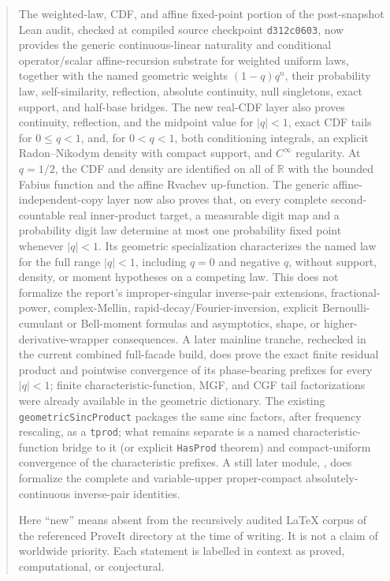 \documentclass[11pt,oneside]{article}
\theoremstyle{definition}
\theoremstyle{remark}
\newcommand{\R}{\mathbb R}
\newcommand{\1}{\mathbf 1}
\begin{document}
\begin{abstract}
The weighted-law, CDF, and affine fixed-point portion of the post-snapshot Lean audit,
checked at compiled source checkpoint
\texttt{d312c0603}, now provides the generic continuous-linear naturality and conditional
operator/scalar affine-recursion substrate for weighted uniform laws, together with the
named geometric weights \((1-q)q^n\), their probability law, self-similarity, reflection,
absolute continuity, null singletons, exact support, and half-base bridges.  The new real-CDF
layer also proves continuity, reflection, and the midpoint value for \(|q|<1\), exact CDF
tails for \(0\le q<1\), and, for \(0<q<1\), both conditioning integrals, an explicit
Radon--Nikodym density with compact support, and \(C^\infty\) regularity.  At \(q=1/2\),
the CDF and density are identified on all of \(\R\) with the bounded Fabius function and
the affine Rvachev up-function.  The generic affine-independent-copy layer now also proves
that, on every complete second-countable real inner-product target, a measurable digit map
and a probability digit law determine at most one probability fixed point whenever
\(|q|<1\).  Its geometric specialization characterizes the named law for the full range
\(|q|<1\), including \(q=0\) and negative \(q\), without support, density, or moment
hypotheses on a competing law.  This does not formalize the report's
improper-singular inverse-pair extensions, fractional-power,
complex-Mellin, rapid-decay/Fourier-inversion, explicit Bernoulli-cumulant or Bell-moment
formulas and asymptotics, shape, or higher-derivative-wrapper consequences.  A later
mainline tranche, rechecked in the current combined full-facade build, does prove the exact
finite residual product and pointwise convergence
of its phase-bearing prefixes for every \(|q|<1\); finite characteristic-function, MGF, and
CGF tail factorizations were already available in the geometric dictionary.  The existing
\texttt{geometricSincProduct} packages the same sinc factors, after frequency rescaling,
as a \texttt{tprod}; what remains separate is a named characteristic-function bridge to it
(or explicit \texttt{HasProd} theorem) and compact-uniform convergence of the
characteristic prefixes.
A still later module, , does
formalize the complete and variable-upper proper-compact absolutely-continuous inverse-pair
identities.

Here ``new'' means absent from the recursively audited LaTeX corpus of the referenced
ProveIt directory at the time of writing.  It is not a claim of worldwide priority.
Each statement is labelled in context as proved, computational, or conjectural.
\end{abstract}
\end{document}
